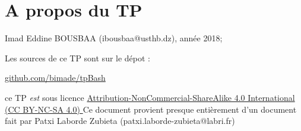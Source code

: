 \documentclass[10pt,a4paper]{article}
\begin{document}
\section*{A propos du TP}
Imad Eddine BOUSBAA (ibousbaa@usthb.dz), année 2018;

Les sources de ce TP sont sur le dépot :

  \begin{center}\url{github.com/bimade/tpBash}\end{center}

  ce TP \emph{est} sous licence
  \href{http://creativecommons.org/licenses/by-nc-sa/4.0/}
  {Attribution-NonCommercial-ShareAlike 4.0 International (CC BY-NC-SA 4.0) }
Ce document provient presque entièrement d'un document fait par Patxi Laborde Zubieta (patxi.laborde-zubieta@labri.fr)
\end{document}

